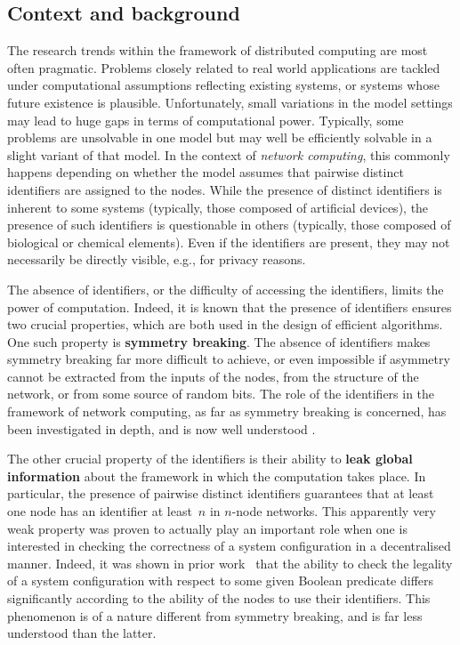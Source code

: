 \documentclass[11pt,a4paper]{article}
\theoremstyle{definition}
\theoremstyle{remark}
\begin{document}
\subsection{Context and background}

The  research trends within the framework of distributed computing are most often pragmatic. Problems closely related to real world applications are tackled under computational assumptions reflecting existing systems, or systems whose future existence is plausible. Unfortunately, small variations in the model settings may lead to huge gaps in terms of computational power. Typically, some problems are unsolvable in one model but may well be efficiently solvable in a slight variant of that model. In the context of \emph{network computing}, this commonly happens depending on whether the model assumes that pairwise distinct identifiers are assigned to the nodes. While the presence of distinct identifiers is inherent to some systems (typically, those composed of artificial devices), the presence of such identifiers is questionable in others (typically, those composed of biological or chemical elements). Even if the identifiers are present, they may not necessarily be directly visible, e.g., for privacy reasons.

The absence of identifiers, or the difficulty of accessing the identifiers, limits the power of computation. Indeed, it is known that the presence of identifiers ensures two crucial properties, which are both used in the design of efficient algorithms. One such property is \textbf{symmetry breaking}. The absence of identifiers makes symmetry breaking far more difficult to achieve, or even impossible if asymmetry cannot be extracted from the inputs of the nodes, from the structure of the network, or from some source of random bits. The role of the identifiers in the framework of network computing, as far as symmetry breaking is concerned, has been investigated in depth, and is now well understood \cite{angluin80local,boldi01effective,chalopin06groupings,czygrinow08fast,diks95anonymous,emek14anonymous,emek14revocable,fraigniaud01labels,goos13local-approximation,hasemann14scheduling,hella15weak-models,lenzen08leveraging,linial92locality,mayer95local,naor95what,norris94classifying-anonymous,yamashita96computing,yamashita99leader,fich03hundreds,kranakis96symmetry,suomela13survey}.

The other crucial property of the identifiers is their ability to \textbf{leak global information} about the framework in which the computation takes place. In particular, the presence of pairwise distinct identifiers guarantees that at least one node has an identifier at least~$n$ in $n$-node networks. This apparently very weak property was proven to actually play an important role when one is interested in checking the correctness of a system configuration  in a decentralised manner. Indeed, it was shown in prior work~\cite{fraigniaud13ld-id} that the ability to check the legality of a system configuration with respect to some given Boolean predicate differs significantly according to the ability of the nodes to use their identifiers. This phenomenon is of a nature different from symmetry breaking, and is far less understood than the latter. 
\end{document}
